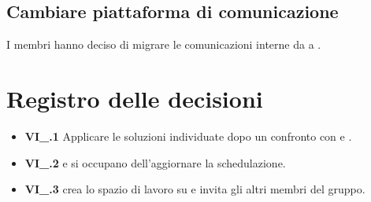 \subsection{Cambiare piattaforma di comunicazione}
I membri hanno deciso di migrare le comunicazioni interne da  a .

\section{Registro delle decisioni}
\begin{itemize}
  \item \textbf{VI\_\Data.1} Applicare le soluzioni individuate dopo un confronto con \VT{} e \CR{}.
  \item \textbf{VI\_\Data.2} \MM{} e \TL{} si occupano dell'aggiornare la schedulazione.
  \item \textbf{VI\_\Data.3} \FF{} crea lo spazio di lavoro su  e invita gli altri membri del gruppo.
\end{itemize}
